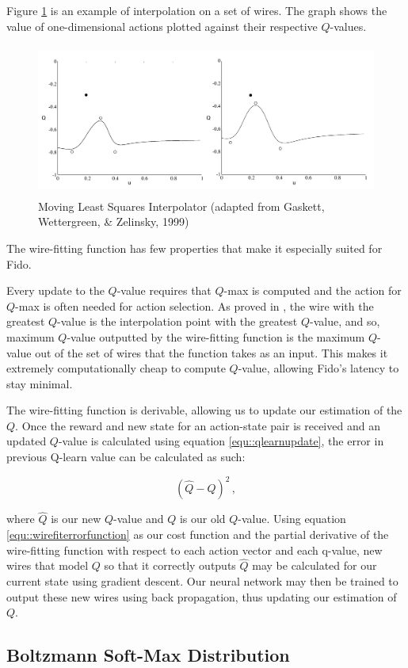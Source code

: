 Figure \ref{fig::wirefitexample} is an example of interpolation on a set of wires. The graph shows the value of one-dimensional actions plotted against their respective $Q$-values.

\begin{figure}[ht]
    \centering
    \includegraphics[height=5cm]{Figures/WireFit.png}
	\caption{Moving Least Squares Interpolator (adapted from Gaskett, Wettergreen, \& Zelinsky, 1999)}
    \label{fig::wirefitexample}
\end{figure}

The wire-fitting function has few properties that make it especially suited for Fido.

Every update to the $Q$-value requires that $Q$-max is computed and the action for $Q$-max is often needed for action selection. As proved in \cite{baird}, the wire with the greatest $Q$-value is the interpolation point with the greatest $Q$-value, and so, maximum $Q$-value outputted by the wire-fitting function is the maximum $Q$-value out of the set of wires that the function takes as an input. This makes it extremely computationally cheap to compute $Q$-value, allowing Fido's latency to stay minimal.

The wire-fitting function is derivable, allowing us to update our estimation of the $Q$. Once the reward and new state for an action-state pair is received and an updated $Q$-value is calculated using equation \ref{equ::qlearnupdate}, the error in previous Q-learn value can be calculated as such:

\begin{equation}
	(\hat{Q} - Q)^2
	\,,
	\label{equ::wirefiterrorfunction}
\end{equation}

where $\hat{Q}$ is our new $Q$-value and $Q$ is our old $Q$-value. Using equation \ref{equ::wirefiterrorfunction} as our cost function and the partial derivative of the wire-fitting function with respect to each action vector and each q-value, new wires that model $Q$ so that it correctly outputs $\hat{Q}$ may be calculated for our current state using gradient descent. Our neural network may then be trained to output these new wires using back propagation, thus updating our estimation of $Q$.

\subsection{Boltzmann Soft-Max Distribution}